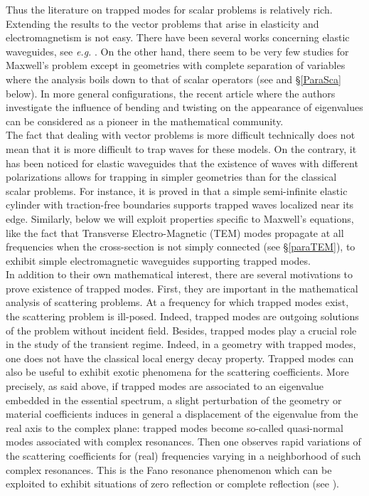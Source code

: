 \documentclass[11pt,a4paper]{article}
\begin{document}
\newline
Thus the literature on trapped modes for scalar problems is relatively rich. Extending the results to the vector problems that arise in elasticity and electromagnetism is not easy. There have been several works concerning elastic waveguides, see \textit{e.g.} \cite{Naza08Elast,Pagn13,Naza20Elast}. On the other hand, there seem to be very few studies for Maxwell's problem except in geometries with complete separation of variables where the analysis boils down to that of scalar operators (see \cite{ExSe90,GoJa92,CLMM93,AYCM06} and \S\ref{ParaSca} below). In more general configurations, the recent article \cite{BCOZ25} where the authors investigate the influence of bending and twisting on the appearance of eigenvalues can be considered as a pioneer in the mathematical community.\\ 
\newline	
The fact that dealing with vector problems is more difficult technically  does not mean that it is more difficult to trap waves for these models. On the contrary, it has been noticed for elastic waveguides that the existence of waves with different polarizations allows for trapping in simpler geometries than for the classical scalar problems. For instance, it is proved in \cite{Pagn13} that a simple semi-infinite elastic cylinder with traction-free boundaries supports trapped waves localized near its edge. Similarly, below we will exploit properties specific to Maxwell's equations, like the fact that Transverse Electro-Magnetic (TEM) modes propagate at all frequencies when the cross-section is not simply connected (see \S\ref{paraTEM}), to exhibit simple electromagnetic waveguides supporting trapped modes.\\
\newline
In addition to their own mathematical interest, there are several motivations to prove existence of trapped modes. First, they are important in the mathematical analysis of scattering problems. At a frequency for which trapped modes exist, the scattering problem is ill-posed. Indeed, trapped modes are outgoing solutions of the problem without incident field. Besides, trapped modes play a crucial role in the study of the transient regime. Indeed, in a geometry with trapped modes, one does not have the classical local energy decay property. Trapped modes can also be useful to exhibit exotic phenomena for the scattering coefficients. More precisely, as said above, if trapped modes are associated to an eigenvalue embedded in the essential spectrum, a slight perturbation of the geometry or material coefficients induces in general a displacement of the eigenvalue from the real axis to the complex plane: trapped modes become so-called quasi-normal modes associated with complex resonances. Then one observes rapid variations of the scattering coefficients for (real) frequencies varying in a neighborhood of such complex resonances. This is the Fano resonance phenomenon which can be exploited to exhibit situations of zero reflection or complete reflection (see \cite{ShTu12,ChNa18,ChNaFano}).\\
\end{document}
